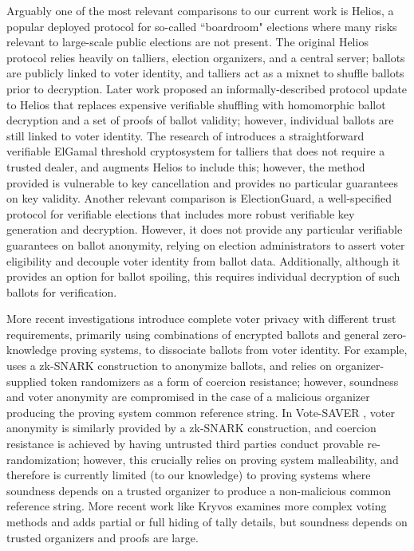 \documentclass{llncs}
\begin{document}
Arguably one of the most relevant comparisons to our current work is Helios, a popular deployed protocol for so-called ``boardroom" elections where many risks relevant to large-scale public elections are not present.
The original Helios protocol \cite{helios} relies heavily on talliers, election organizers, and a central server; ballots are publicly linked to voter identity, and talliers act as a mixnet to shuffle ballots prior to decryption.
Later work proposed an informally-described protocol update to Helios \cite{helios2} that replaces expensive verifiable shuffling with homomorphic ballot decryption and a set of proofs of ballot validity; however, individual ballots are still linked to voter identity.
The research of \cite{cortier} introduces a straightforward verifiable ElGamal threshold cryptosystem for talliers that does not require a trusted dealer, and augments Helios to include this; however, the method provided is vulnerable to key cancellation and provides no particular guarantees on key validity.
Another relevant comparison is ElectionGuard, a well-specified protocol for verifiable elections \cite{electionguard} that includes more robust verifiable key generation and decryption.
However, it does not provide any particular verifiable guarantees on ballot anonymity, relying on election administrators to assert voter eligibility and decouple voter identity from ballot data.
Additionally, although it provides an option for ballot spoiling, this requires individual decryption of such ballots for verification.

More recent investigations introduce complete voter privacy with different trust requirements, primarily using combinations of encrypted ballots and general zero-knowledge proving systems, to dissociate ballots from voter identity.
For example, \cite{dimitriou} uses a zk-SNARK construction to anonymize ballots, and relies on organizer-supplied token randomizers as a form of coercion resistance; however, soundness and voter anonymity are compromised in the case of a malicious organizer producing the proving system common reference string.
In Vote-SAVER \cite{saver}, voter anonymity is similarly provided by a zk-SNARK construction, and coercion resistance is achieved by having untrusted third parties conduct provable re-randomization; however, this crucially relies on proving system malleability, and therefore is currently limited (to our knowledge) to proving systems where soundness depends on a trusted organizer to produce a non-malicious common reference string.
More recent work like Kryvos \cite{kryvos} examines more complex voting methods and adds partial or full hiding of tally details, but soundness depends on trusted organizers and proofs are large.
\end{document}
